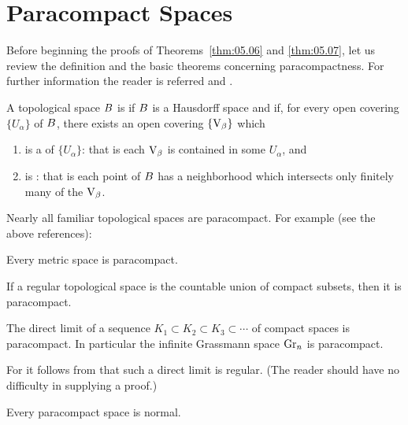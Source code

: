 \documentclass[../main]{subfiles}
\begin{document}
\section{Paracompact Spaces} \label{sec:5.3}
Before beginning the proofs of Theorems~\ref{thm:05.06} and \ref{thm:05.07}, let us review the definition and the basic theorems concerning paracompactness. For further information the reader is referred \cite{kelley1955} and \cite{dugundji1966}. 

\begin{definition}
A topological space $B$ is  if $B$ is a Hausdorff space and if, for every open covering $\{U_\alpha\}$ of $B$, there exists an open covering $\{\operatorname{V}_\beta\}$ which

\begin{enumerate}[label=\arabic*)]
    \item is a  of $\{U_\alpha\}$: that is each $\operatorname{V}_\beta$ is contained in some $U_\alpha$, and
    \item is : that is each point of $B$ has a neighborhood which intersects only finitely many of the $\operatorname{V}_\beta$. 
\end{enumerate}
\end{definition}

Nearly all familiar topological spaces are paracompact. For example (see the above references):
\begin{theorem*}[A. H. Stone]\label{thm:5.8}
Every metric space is paracompact.
\end{theorem*}
\begin{theorem*}[Morita]\label{thm:05.09}
If a regular topological space is the countable union of compact subsets, then it is paracompact.
\end{theorem*}

\begin{corollary*}
The direct limit of a sequence $K_1 \subset K_2 \subset K_3 \subset \cdots$ of compact spaces is paracompact. In particular the infinite Grassmann space $\operatorname{Gr}_n$ is paracompact. 
\end{corollary*}

For it follows from \cite[\S 18.3]{whitehead1961} that such a direct limit is regular. (The reader should have no difficulty in supplying a proof.)
\begin{theorem*}[Dieudonné]
Every paracompact space is normal.
\end{theorem*}
\end{document}
